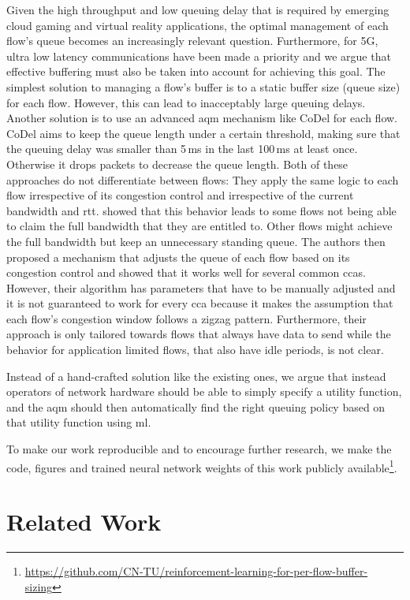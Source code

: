 \documentclass[conference]{IEEEtran}
\begin{document}
Given the high throughput and low queuing delay that is required by emerging cloud gaming \cite{jarschel_evaluation_2011} and virtual reality \cite{elbamby_toward_2018} applications, the optimal management of each flow's queue becomes an increasingly relevant question. Furthermore, for 5G, ultra low latency communications have been made a priority \cite{li_5g_2018} and we argue that effective buffering must also be taken into account for achieving this goal. The simplest solution to managing a flow's buffer is to a static buffer size (queue size) for each flow. However, this can lead to inacceptably large queuing delays. Another solution is to use an advanced \gls{aqm} mechanism like CoDel for each flow. CoDel aims to keep the queue length under a certain threshold, making sure that the queuing delay was smaller than 5\,ms in the last 100\,ms at least once. Otherwise it drops packets to decrease the queue length. Both of these approaches do not differentiate between flows: They apply the same logic to each flow irrespective of its congestion control and irrespective of the current bandwidth and \gls{rtt}. \cite{bachl_cocoa_2019} showed that this behavior leads to some flows not being able to claim the full bandwidth that they are entitled to. Other flows might achieve the full bandwidth but keep an unnecessary standing queue. The authors then proposed a mechanism that adjusts the queue of each flow based on its congestion control and showed that it works well for several common \glspl{cca}. However, their algorithm has parameters that have to be manually adjusted and it is not guaranteed to work for every \gls{cca} because it makes the assumption that each flow's congestion window follows a zigzag pattern. Furthermore, their approach is only tailored towards flows that always have data to send while the behavior for application limited flows, that also have idle periods, is not clear. 

Instead of a hand-crafted solution like the existing ones, we argue that instead operators of network hardware should be able to simply specify a utility function, and the \gls{aqm} should then automatically find the right queuing policy based on that utility function using \gls{ml}. 

To make our work reproducible and to encourage further research, we make the code, figures and trained neural network weights of this work publicly available\footnote{\scriptsize\url{https://github.com/CN-TU/reinforcement-learning-for-per-flow-buffer-sizing}}. 

\section{Related Work}
\end{document}
